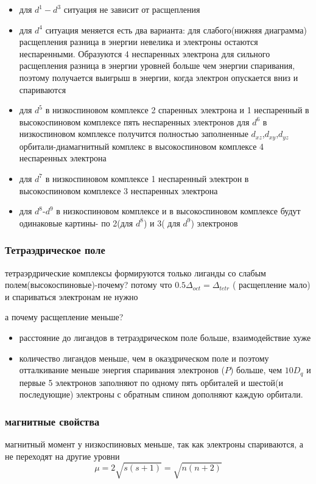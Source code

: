  \begin{itemize}
 \item для $d^1-d^3$ ситуация не зависит от расщепления \item для $d^4$ ситуация меняется есть два варианта: для слабого(нижняя диаграмма) расщепления разница в энергии невелика и электроны остаются неспаренными. Образуются 4 неспаренных электрона  для сильного расщепления разница в энергии уровней больше чем энергии спаривания, поэтому получается выигрыш в энергии, когда электрон опускается вниз и спариваются \item для $d^5$ в низкоспиновом комплексе 2 спаренных электрона и 1 неспаренный в высокоспиновом комплексе пять неспаренных электронов для $d^6$ в низкоспиновом комплексе получится полностью заполненные $d_{xz}$,$d_{xy}$,$d_{yz}$ орбитали-диамагнитный комплекс в высокоспиновом комплексе 4 неспаренных электрона 
 \item для $d^7$ в низкоспиновом комплексе 1 неспаренный электрон в высокоспиновом комплексе 3 неспаренных электрона 
 \item для $d^8$-$d^9$ в низкоспиновом комплексе и в высокоспиновом комплексе будут одинаковые картины- по 2(для $d^8$) и 3( для $d^9$) электронов 
 \end{itemize}

\subsubsection*{Тетраэдрическое поле}
тетраэрдрические комплексы формируются только лиганды со слабым полем(высокоспиновые)-почему? потому что $0.5\Delta_{oct}=\Delta_{tetr}$ ( расщепление мало) и спариваться электронам не нужно

а почему расщепление меньше?
\begin{itemize}
\item расстояние до лигандов в тетраэдрическом поле больше, взаимодействие хуже 
\item количество лигандов меньше, чем в окаэдрическом поле и поэтому отталкивание меньше энергия спаривания электронов ($P$) больше, чем $10D_q$ и первые 5 электронов заполняют по одному пять орбиталей и шестой(и последующие) электроны с обратным спином дополняют каждую орбитали. 
\end{itemize}

\subsubsection*{магнитные свойства}
 магнитный момент у низкоспиновых меньше, так как электроны спариваются, а не переходят на другие уровни 
$$\mu=2\sqrt{s(s+1)}=\sqrt{n(n+2)}$$ 


